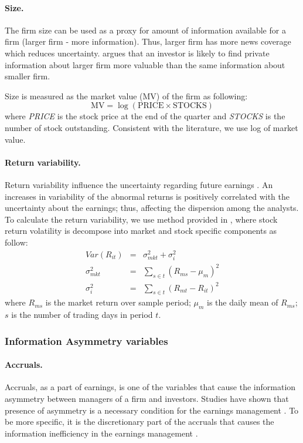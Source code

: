 \documentclass{article}\usepackage[]{graphicx}\usepackage[]{color}
\begin{document}
\paragraph{Size.} The firm size can be used as a proxy for amount of information available for a firm (larger firm - more information). Thus, larger firm has more news coverage which reduces uncertainty. \cite{bhushan1989} argues that an investor is likely to find private information about larger firm more valuable than the same information about smaller firm. 

Size is measured as the market value (MV) of the firm as following:
\begin{equation}
\mathrm{MV}= \log(\mathrm{PRICE} \times \mathrm{STOCKS})
\end{equation}
where \emph{PRICE}  is the stock price at the end of the quarter and \emph{STOCKS} is the number of stock outstanding. Consistent with the literature, we use log of market value. 


\paragraph{Return variability.}
Return variability influence the uncertainty regarding future earnings \citep{henley2003, diether2002}. An increases in variability of the abnormal returns is positively correlated with the uncertainty about the earnings; thus, affecting the dispersion among the analysts. To calculate the return variability, we use method provided in \cite{sousa2008}, where stock return volatility is decompose into market and stock specific components as follow:
\begin{eqnarray}
Var (R_{it})&=&\sigma^2_{mkt}+\sigma^2_{i} \\
\sigma^2_{mkt}&=&\sum_{s\in t} (R_{ms}-\mu_{m})^2 \nonumber \\ 
\sigma^2_{i}&=&\sum_{s \in t} (R_{mt}-R_{it})^2 \nonumber
\end{eqnarray}
where $R_{ms}$ is the market return over sample period; $\mu_{m}$ is the daily mean of $R_{ms}$; $s$ is the number of trading days in period $t$.

\subsubsection{Information Asymmetry variables}

\paragraph{Accruals.} 
Accruals, as a part of  earnings, is one of the variables that cause the information asymmetry between managers of a firm and investors. Studies have shown that presence of asymmetry is a necessary condition for the earnings management \citep{trueman1988,richardson2000}. To be more specific, it is the discretionary part of the accruals that causes  the information inefficiency  in the earnings management \citep{richardson2000,ahmed2005}. 
\end{document}
